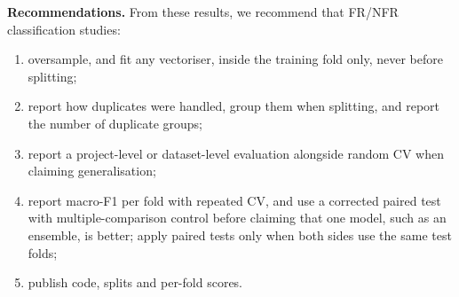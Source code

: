 \textbf{Recommendations.} From these results, we recommend that FR/NFR classification studies:
\begin{enumerate}
\item oversample, and fit any vectoriser, inside the training fold only, never before splitting;
\item report how duplicates were handled, group them when splitting, and report the number of duplicate groups;
\item report a project-level or dataset-level evaluation alongside random CV when claiming generalisation;
\item report macro-F1 per fold with repeated CV, and use a corrected paired test with multiple-comparison control before claiming that one model, such as an ensemble, is better; apply paired tests only when both sides use the same test folds;
\item publish code, splits and per-fold scores.
\end{enumerate}
